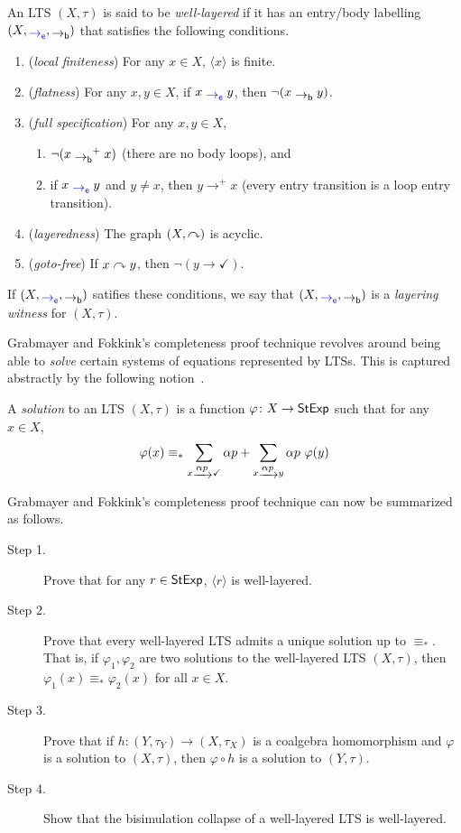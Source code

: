 \documentclass[orivec,envcountsect,envcountsame]{llncs}
\begin{document}
\begin{definition}\label{def:well-layeredness}
	An LTS \((X, \tau)\) is said to be \emph{well-layered} if it has an entry/body labelling \((X, \eo, \bo)\) that satisfies the following conditions.
	\begin{enumerate}
		\item (\emph{local finiteness}) For any \(x \in X\), \(\langle x \rangle\) is finite.
		\item (\emph{flatness}) For any \(x,y \in X\), if \(x \eo y\), then \(\neg (x \bo y)\).
		\item (\emph{full specification}) For any \(x,y \in X\),
		\begin{enumerate}
			\item \(\neg(x \bo^+ x)\) (there are no body loops), and
			\item if \(x \eo y\) and \(y \neq x\), then \(y \to^+ x\) (every entry transition is a loop entry transition).
		\end{enumerate}
		\item (\emph{layeredness}) The graph \((X, \mathrel{\curvearrowright})\) is acyclic.
		\item (\emph{goto-free}) If \(x \mathrel{\curvearrowright} y\), then \(\neg(y \to \checkmark)\).
	\end{enumerate}
	If \((X, \eo, \bo)\) satifies these conditions, we say that \((X, \eo, \bo)\) is a \emph{layering witness} for \((X, \tau)\).
\end{definition}

Grabmayer and Fokkink's completeness proof technique revolves around being able to \emph{solve} certain systems of equations represented by LTSs.
This is captured abstractly by the following notion~\cite[Definition 2.8]{regexlics}.

\begin{definition}
	A \emph{solution} to an LTS \((X, \tau)\) is a function \(\varphi\colon X \to \mathsf{StExp}\) such that for any \(x \in X\),
	\[
		\varphi(x) \equiv_* \sum_{x \tr{\alpha p} \checkmark} \alpha p + \sum_{x \tr{\alpha p} y} \alpha p~\varphi(y)
	\]
\end{definition}

Grabmayer and Fokkink's completeness proof technique can now be summarized as follows.
\begin{description}
	\item[Step 1.] Prove that for any \(r \in \mathsf{StExp}\), \(\langle r \rangle\) is well-layered.
	\item[Step 2.] Prove that every  well-layered LTS admits a unique solution up to \(\equiv_*\).
	That is, if \(\varphi_1,\varphi_2\) are two solutions to the well-layered LTS \((X, \tau)\), then \(\varphi_1(x) \equiv_* \varphi_2(x)\) for all \(x \in X\).
	\item[Step 3.] Prove that if \(h \colon (Y, \tau_Y) \to (X, \tau_X)\) is a coalgebra homomorphism and \(\varphi\) is a solution to \((X, \tau)\), then \(\varphi \circ h\) is a solution to \((Y, \tau)\).
	\item[Step 4.] Show that the bisimulation collapse of a well-layered LTS is well-layered.
\end{description}
\end{document}
